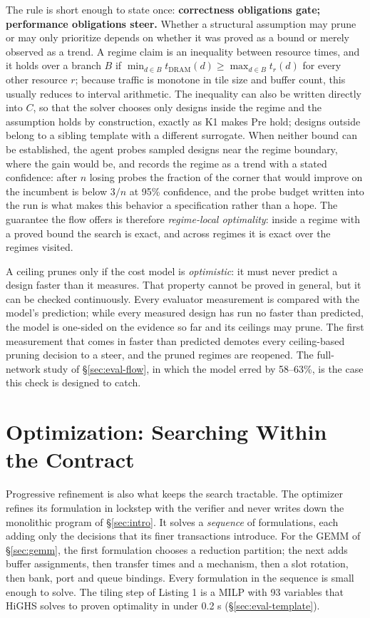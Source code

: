\documentclass[11pt]{article}
\begin{document}
The rule is short enough to state once: \textbf{correctness obligations gate; performance obligations steer.} Whether a structural assumption may prune or may only prioritize depends on whether it was proved as a bound or merely observed as a trend. A regime claim is an inequality between resource times, and it holds over a branch \(B\) if \(\min_{d\in B}t_{\mathrm{DRAM}}(d)\ge\max_{d\in B}t_r(d)\) for every other resource \(r\); because traffic is monotone in tile size and buffer count, this usually reduces to interval arithmetic. The inequality can also be written directly into \(C\), so that the solver chooses only designs inside the regime and the assumption holds by construction, exactly as K1 makes \(\mathrm{Pre}\) hold; designs outside belong to a sibling template with a different surrogate. When neither bound can be established, the agent probes sampled designs near the regime boundary, where the gain would be, and records the regime as a trend with a stated confidence: after \(n\) losing probes the fraction of the corner that would improve on the incumbent is below \(3/n\) at 95\% confidence, and the probe budget written into the run is what makes this behavior a specification rather than a hope. The guarantee the flow offers is therefore \emph{regime-local optimality}: inside a regime with a proved bound the search is exact, and across regimes it is exact over the regimes visited.

A ceiling prunes only if the cost model is \emph{optimistic}: it must never predict a design faster than it measures. That property cannot be proved in general, but it can be checked continuously. Every evaluator measurement is compared with the model's prediction; while every measured design has run no faster than predicted, the model is one-sided on the evidence so far and its ceilings may prune. The first measurement that comes in faster than predicted demotes every ceiling-based pruning decision to a steer, and the pruned regimes are reopened. The full-network study of §\ref{sec:eval-flow}, in which the model erred by 58--63\%, is the case this check is designed to catch.

\section{Optimization: Searching Within the Contract}\label{sec:optimization}

Progressive refinement is also what keeps the search tractable. The optimizer refines its formulation in lockstep with the verifier and never writes down the monolithic program of §\ref{sec:intro}. It solves a \emph{sequence} of formulations, each adding only the decisions that its finer transactions introduce. For the GEMM of §\ref{sec:gemm}, the first formulation chooses a reduction partition; the next adds buffer assignments, then transfer times and a mechanism, then a slot rotation, then bank, port and queue bindings. Every formulation in the sequence is small enough to solve. The tiling step of Listing 1 is a MILP with 93 variables that HiGHS solves to proven optimality in under 0.2 s (§\ref{sec:eval-template}).
\end{document}
